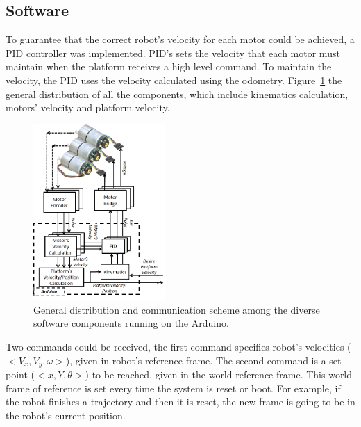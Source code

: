 \subsection{Software}
To guarantee that the correct robot's velocity for each motor could be achieved, a PID controller was implemented. PID's sets the velocity  that each motor must maintain when the platform receives a high level command. To maintain the velocity, the PID uses the velocity calculated using the odometry. Figure~\ref{fig:distribution} the general distribution of all the components, which include kinematics calculation, motors' velocity and platform velocity. 

\begin{figure}
	\centering
	\includegraphics[width=0.45\textwidth]{Images/version-2-program.png} 
	\caption{General distribution and communication scheme among the diverse software components running on the Arduino.}
	\label{fig:distribution}
\end{figure}

Two commands could be received,  the first command specifies robot's velocities ($<V_x,V_y,\omega>$), given in robot's reference frame. The second command is a set point ($<x, Y, \theta>$) to be reached, given in the world reference frame. This world frame of reference is set every time the system is reset or boot. For example, if the robot finishes a trajectory and then it is reset, the new frame is going to be in the robot's current position.